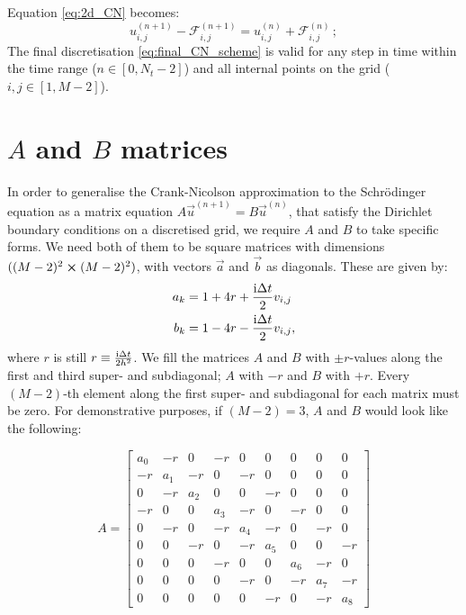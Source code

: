Equation \eqref{eq:2d_CN} becomes:
\begin{equation}\label{eq:final_CN_scheme}
    u_{i,j}^{(n+1)} - \mathcal{F}_{i,j}^{(n+1)} = u_{i, j}^{(n)} + \mathcal{F}_{i,j}^{(n)} \, ;
\end{equation}
The final discretisation \eqref{eq:final_CN_scheme} is valid for any step in time within the time range ($n\in[0, N_t-2]$) and all internal points on the grid ($i,j \in [1, M-2]$).


\newpage

\section{$A$ and $B$ matrices}\label{app:A_and_B}
    In order to generalise the Crank-Nicolson approximation to the Schrödinger equation as a matrix equation $A\vec{u}^{(n+1)} = B\vec{u}^{(n)}$, that satisfy the Dirichlet boundary conditions on a discretised grid, we require $A$ and $B$ to take specific forms. We need both of them to be square matrices with dimensions $((M-2)^2\cross(M-2)^2)$, with vectors $\vec{a}$ and $\vec{b}$ as diagonals. These are given by:
    \begin{equation}
        \begin{split}
            a_k &= 1+4r +\frac{\mathrm{i}\Delta t}{2}v_{i,j} \\
            b_k &= 1-4r -\frac{\mathrm{i}\Delta t}{2}v_{i,j},
        \end{split}
    \end{equation}
    where $r$ is still $r\equiv \frac{\mathrm{i}\Delta t}{2h^2}$. We fill the matrices $A$ and $B$ with $\pm r$-values along the first and third super- and subdiagonal; $A$ with $-r$ and $B$ with $+r$. Every $(M-2)$-th element along the first super- and subdiagonal for each matrix must be zero. For demonstrative purposes, if $(M-2)=3$, $A$ and $B$ would look like the following:

    \begin{equation}
        A = 
        \begin{bmatrix} 
            a_0 & -r  & 0 & -r & 0 & 0 & 0 & 0 & 0 \\
            -r  & a_1 & -r & 0 & -r & 0 & 0 & 0 & 0 \\
             0  & -r  & a_2 & 0 & 0 & -r & 0 & 0 & 0 \\
            -r  & 0   & 0 & a_3 & -r & 0 & -r & 0 & 0 \\
             0  & -r  & 0 & -r & a_4 & -r & 0 & -r & 0 \\ 
             0  & 0   & -r & 0 & -r & a_5 & 0 & 0 & -r \\
             0  & 0   & 0 & -r & 0 & 0 & a_6 & -r & 0 \\
             0  & 0   & 0 & 0 & -r & 0 & -r & a_7 & -r \\
             0  & 0   & 0 & 0 & 0 & -r & 0 & -r & a_8  
        \end{bmatrix}
    \end{equation}

